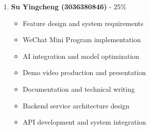 \begin{enumerate}
    \item \textbf{Su Yingcheng (3036380846)} - 25\%
    \begin{itemize}
        \item Feature design and system requirements
        \item WeChat Mini Program implementation
        \item AI integration and model optimization
        \item Demo video production and presentation
        \item Documentation and technical writing
        \item Backend service architecture design
        \item API development and system integration
    \end{itemize}
\end{enumerate} 